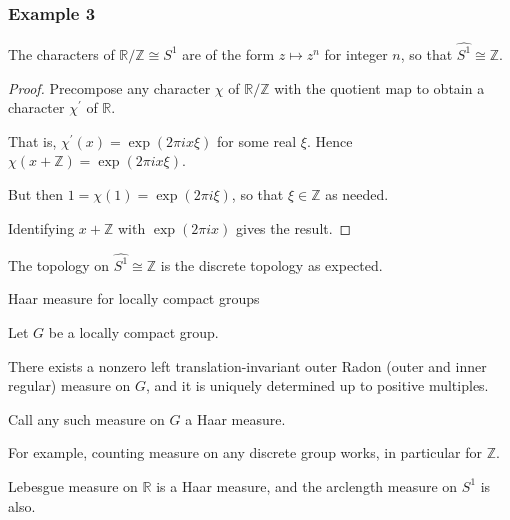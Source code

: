 \documentclass[mathserif
, handout
]{beamer}
\begin{document}
\begin{frame}
    \frametitle{Example 3}
The characters of $\mathbb{R}/\mathbb{Z}\cong S^1$ are of the form $z\mapsto z^n$ for integer $n$, so that $\widehat{S^1}\cong \mathbb{Z}$. \pause \begin{proof}
    Precompose any character $\chi$ of $\mathbb{R}/\mathbb{Z}$ with the quotient map to obtain a character $\chi^\prime$ of $\mathbb{R}$.\pause 

    That is, $\chi^\prime(x) = \exp(2\pi i x\xi)$ for some real $\xi$. Hence $\chi(x+\mathbb{Z}) = \exp(2\pi i x\xi)$.\pause 

    But then $1 = \chi(1) = \exp(2\pi i \xi)$, so that $\xi\in \mathbb{Z}$ as needed. \pause 

    Identifying $x+\mathbb{Z}$ with $\exp(2\pi i x)$ gives the result.
\end{proof} \pause
The topology on $\widehat{S^1}\cong\mathbb{Z}$ is the discrete topology as expected.
\end{frame}

\begin{frame}{Haar measure for locally compact groups}
    \begin{Theorem}[Haar]
        Let $G$ be a locally compact group. \pause 

        There exists a nonzero left translation-invariant outer Radon (outer and inner regular) measure on $G$, and it is uniquely determined up to positive multiples.

        Call any such measure on $G$ a Haar measure.
    \end{Theorem}
    \pause

    For example, counting measure on any discrete group works, in particular for $\mathbb{Z}$. 
    \pause 

    Lebesgue measure on $\mathbb{R}$ is a Haar measure, and the arclength measure on $S^1$ is also.
\end{frame}
\end{document}
